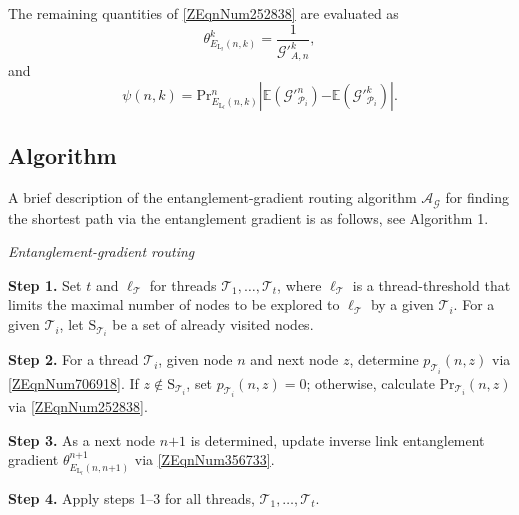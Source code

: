 \documentclass[11pt]{article}%
\begin{document}
 The remaining quantities of \eqref{ZEqnNum252838} are evaluated as 
\begin{equation} \label{43)} 
{\theta }^k_{E_{{\mathrm{L}}_l}\left(n,k\right)}\mathrm{=}\frac{\mathrm{1}}{{\mathcal{G}}'^k_{A,n}},                                                                           
\end{equation} 
and
\begin{equation} \label{44)} 
\psi \left(n,k\right)\mathrm{=P}{\mathrm{r}}^n_{E_{{\mathrm{L}}_l}\left(n,k\right)}\left|\mathbb{E}\left({\mathcal{G}}'^n_{{\mathcal{P}}_i}\right)\mathrm{-}\mathbb{E}\left({\mathcal{G}}'^k_{{\mathcal{P}}_i}\right)\right|.                                                 
\end{equation} 
 
\subsection{Algorithm}

A brief description of the entanglement-gradient routing algorithm ${\mathcal{A}}_{\mathcal{G}}$ for finding the shortest path via the entanglement gradient is as follows, see Algorithm 1. 
\setcounter{algocf}{0}
\begin{algorithm}
\DontPrintSemicolon    
\caption{\textit{Entanglement-gradient routing}}
\textbf{Step 1.} Set $t$ and ${\ell }_{\mathcal{T}}$ for threads ${\mathcal{T}}_{\mathrm{1}}\mathrm{,\dots ,}{\mathcal{T}}_t$, where ${\ell }_{\mathcal{T}}$ is a thread-threshold that limits the maximal number of nodes to be explored to ${\ell }_{\mathcal{T}}$ by a given ${\mathcal{T}}_i$. For a given ${\mathcal{T}}_i$, let ${\mathrm{S}}_{{\mathcal{T}}_i}$ be a set of already visited nodes.

\textbf{Step 2.} For a thread ${\mathcal{T}}_i$, given node $n$ and next node $z$, determine $p_{{\mathcal{T}}_i}\left(n,z\right)$ via \eqref{ZEqnNum706918}. If $z\mathrm{\notin }{\mathrm{S}}_{{\mathcal{T}}_i}$, set $p_{{\mathcal{T}}_i}\left(n,z\right)\mathrm{=0}$; otherwise, calculate $\mathrm{P}{\mathrm{r}}_{{\mathcal{T}}_i}\left(n,z\right)$ via \eqref{ZEqnNum252838}. 

\textbf{Step 3.} As a next node $n\mathrm{+1}$ is determined, update inverse link entanglement gradient ${\theta }^{n\mathrm{+1}}_{E_{{\mathrm{L}}_l}\left(n,n\mathrm{+1}\right)}$ via \eqref{ZEqnNum356733}. 

\textbf{Step 4.} Apply steps 1--3 for all threads, ${\mathcal{T}}_{\mathrm{1}}\mathrm{,\dots ,}{\mathcal{T}}_t$. 
\end{algorithm}
\end{document}
